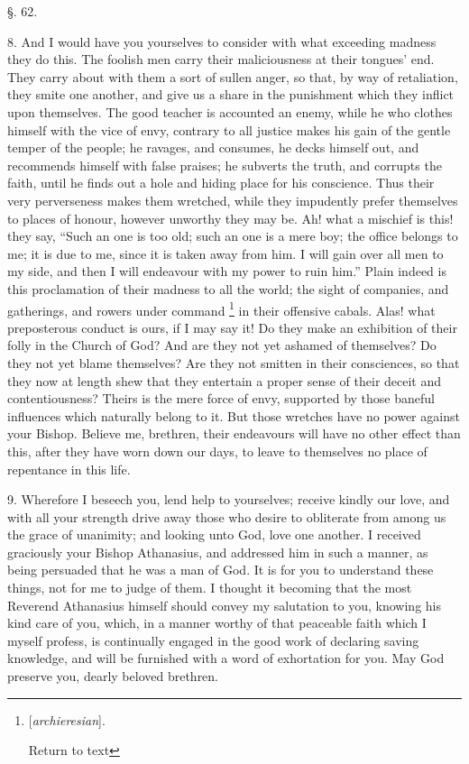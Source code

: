 §. 62.

8. And I would have you yourselves to consider
with what exceeding madness they do this. The foolish men carry their
maliciousness at their tongues’ end. They carry about with them a
sort of sullen anger, so that, by way of retaliation, they smite one
another, and give us a share in the punishment which they inflict upon
themselves. The good teacher is accounted an enemy, while he who
clothes himself with the vice of envy, contrary to all justice makes
his gain of the gentle temper of the people; he ravages, and consumes,
he decks himself out, and recommends himself with false praises; he
subverts the truth, and corrupts the faith, until he finds out a hole
and hiding place for his conscience. Thus their very perverseness
makes them wretched, while they impudently prefer themselves to places
of honour, however unworthy they may be. Ah! what a mischief is this!
they say, “Such an one is too old; such an one is a mere boy; the
office belongs to me; it is due to me, since it is taken away from
him. I will gain over all men to my side, and then I will endeavour
with my power to ruin him.” Plain indeed is this proclamation of
their madness to all the world; the sight of companies, and
gatherings, and rowers under command \footnote{[\emph{archieresian}].

Return to text} in their offensive cabals. Alas! what preposterous conduct is
ours, if I may say it! Do they make an exhibition of their folly in
the Church of God? And are they not yet ashamed of themselves? Do
they not yet blame themselves? Are they not smitten in their
consciences, so that they now at length shew that they entertain a
proper sense of their deceit and contentiousness? Theirs is the mere
force of envy, supported by those baneful influences which naturally
belong to it. But those wretches have no power against your Bishop.
Believe me, brethren, their endeavours will have no other effect than
this, after they have worn down our days, to leave to themselves no
place of repentance in this life.

9. Wherefore I beseech you, lend help to
yourselves; receive kindly our love, and with all your strength drive
away those who desire to obliterate from among us the grace of
unanimity; and looking unto God, love one another. I received
graciously your Bishop Athanasius, and addressed him in such a manner,
as being persuaded that he was a man of God. It is for you to
understand these things, not for me to judge of them. I thought it
becoming that the most Reverend Athanasius himself should convey my
salutation to you, knowing his kind care of you, which, in a manner
worthy of that peaceable faith which I myself profess, is continually
engaged in the good work of declaring saving knowledge, and will be
furnished with a word of exhortation for you. May God preserve you,
dearly beloved brethren.

